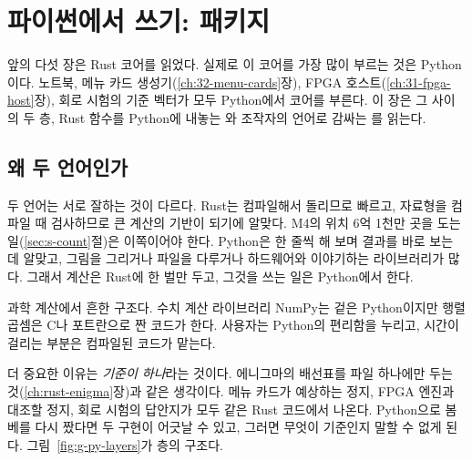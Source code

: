 \chapter{파이썬에서 쓰기: \texorpdfstring{}{christopher} 패키지}\label{ch:15-python-api}
\begingroup\setlength{\emergencystretch}{3em}%

앞의 다섯 장은 Rust 코어를 읽었다. 실제로 이 코어를 가장 많이 부르는 것은 Python이다. 노트북, 메뉴 카드
생성기(\ref{ch:32-menu-cards}장), FPGA 호스트(\ref{ch:31-fpga-host}장), 회로 시험의 기준 벡터가 모두 Python에서
코어를 부른다. 이 장은 그 사이의 두 층, Rust 함수를 Python에 내놓는 와 조작자의
언어로 감싸는 를 읽는다.

\section{왜 두 언어인가}\label{sec:py-why}

\Why 두 언어는 서로 잘하는 것이 다르다. Rust는 컴파일해서 돌리므로 빠르고, 자료형을 컴파일 때 검사하므로 큰
계산의 기반이 되기에 알맞다. M4의 위치 6억 1천만 곳을 도는 일(\ref{sec:s-count}절)은 이쪽이어야 한다. Python은
한 줄씩 해 보며 결과를 바로 보는 데 알맞고, 그림을 그리거나 파일을 다루거나 하드웨어와 이야기하는 라이브러리가
많다. 그래서 계산은 Rust에 한 벌만 두고, 그것을 쓰는 일은 Python에서 한다.

\General 과학 계산에서 흔한 구조다. 수치 계산 라이브러리 NumPy는 겉은 Python이지만 행렬 곱셈은 C나 포트란으로
짠 코드가 한다. 사용자는 Python의 편리함을 누리고, 시간이 걸리는 부분은 컴파일된 코드가 맡는다.

\Ours 더 중요한 이유는 \emph{기준이 하나}라는 것이다. 에니그마의 배선표를 파일 하나에만 두는 것(\ref{ch:rust-enigma}장)과
같은 생각이다. 메뉴 카드가 예상하는 정지, FPGA 엔진과 대조할 정지, 회로 시험의 답안지가 모두 같은 Rust 코드에서
나온다. Python으로 봄베를 다시 짰다면 두 구현이 어긋날 수 있고, 그러면 무엇이 기준인지 말할 수 없게 된다.
그림~\ref{fig:g-py-layers}가 층의 구조다.

